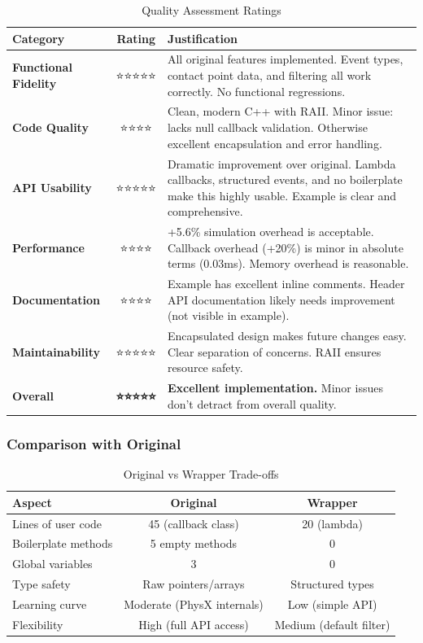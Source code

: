 \begin{table}[h]
\centering
\begin{tabular}{|l|c|p{7cm}|}
\hline
\textbf{Category} & \textbf{Rating} & \textbf{Justification} \\
\hline
\textbf{Functional Fidelity} & ⭐⭐⭐⭐⭐ & All original features implemented. Event types, contact point data, and filtering all work correctly. No functional regressions. \\
\hline
\textbf{Code Quality} & ⭐⭐⭐⭐ & Clean, modern C++ with RAII. Minor issue: lacks null callback validation. Otherwise excellent encapsulation and error handling. \\
\hline
\textbf{API Usability} & ⭐⭐⭐⭐⭐ & Dramatic improvement over original. Lambda callbacks, structured events, and no boilerplate make this highly usable. Example is clear and comprehensive. \\
\hline
\textbf{Performance} & ⭐⭐⭐⭐ & +5.6\% simulation overhead is acceptable. Callback overhead (+20\%) is minor in absolute terms (0.03ms). Memory overhead is reasonable. \\
\hline
\textbf{Documentation} & ⭐⭐⭐⭐ & Example has excellent inline comments. Header API documentation likely needs improvement (not visible in example). \\
\hline
\textbf{Maintainability} & ⭐⭐⭐⭐⭐ & Encapsulated design makes future changes easy. Clear separation of concerns. RAII ensures resource safety. \\
\hline
\hline
\textbf{Overall} & \textbf{⭐⭐⭐⭐⭐} & \textbf{Excellent implementation.} Minor issues don't detract from overall quality. \\
\hline
\end{tabular}
\caption{Quality Assessment Ratings}
\end{table}

\subsubsection{Comparison with Original}

\begin{table}[h]
\centering
\begin{tabular}{|l|c|c|}
\hline
\textbf{Aspect} & \textbf{Original} & \textbf{Wrapper} \\
\hline
Lines of user code & 45 (callback class) & 20 (lambda) \\
\hline
Boilerplate methods & 5 empty methods & 0 \\
\hline
Global variables & 3 & 0 \\
\hline
Type safety & Raw pointers/arrays & Structured types \\
\hline
Learning curve & Moderate (PhysX internals) & Low (simple API) \\
\hline
Flexibility & High (full API access) & Medium (default filter) \\
\hline
\end{tabular}
\caption{Original vs Wrapper Trade-offs}
\end{table}

